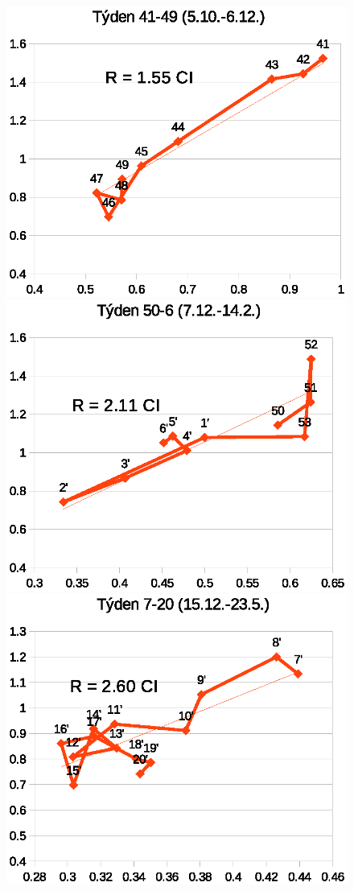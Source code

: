 \begin{figure}
\begin{center}
\includegraphics[scale=0.35]{pic/g3}
\includegraphics[scale=0.35]{pic/g4}\includegraphics[scale=0.35]{pic/g5}

\end{center}
\end{figure}
